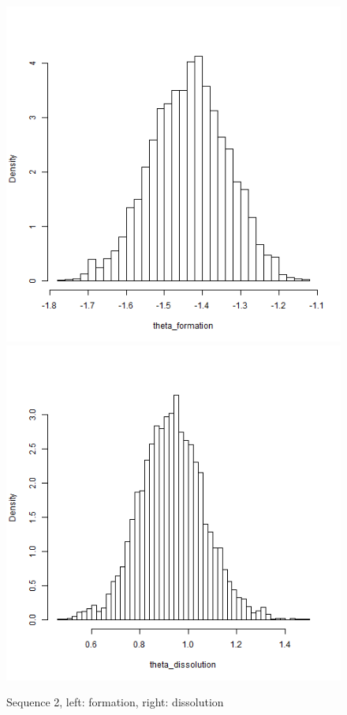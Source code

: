 \documentclass[aspectratio=169,ignorenonframetext,9pt]{beamer}
\theoremstyle{plain}
\theoremstyle{definition}
\begin{document}
\begin{figure}[h]
    \begin{center}
        \includegraphics[scale=0.23]{pictures/net2seq_chain1_BSTERGM_formation_histogram.png}
        \includegraphics[scale=0.23]{pictures/net2seq_chain1_BSTERGM_dissolution_histogram.png}
    \caption{Sequence 2, left: formation, right: dissolution}
    \end{center}
\end{figure}
\end{document}
